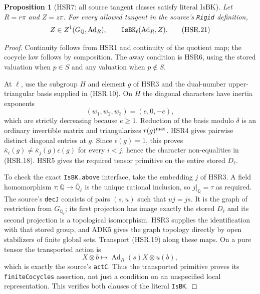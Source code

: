 \documentclass[11pt,a4paper]{article}
\numberwithin{equation}{section}
\newtheorem{proposition}[theorem]{Proposition}
\theoremstyle{remark}\newtheorem{remark}[theorem]{Remark}
\begin{document}
\begin{proposition}[HSR7: all source tangent classes satisfy literal IsBK]
\label{claim:HSR7}
Let $R=r\pi$ and $Z=z\pi$.  For every allowed tangent in the
source's \texttt{Rigid} definition,
\[
       Z\in Z^1(G_{\mathbb Q},\operatorname{Ad}_R),
       \qquad \texttt{Is\allowbreak BK}_{\ell}(\operatorname{Ad}_R,\allowbreak{} Z).
 \tag{HSR.21}
\]
\end{proposition}
\begin{proof}
Continuity follows from HSR1 and continuity of the quotient map;
the cocycle law follows by composition.  The away condition is
HSR6, using the stored valuation when $p\in S$ and any valuation
when $p\notin S$.

At $\ell$, use the subgroup $H$ and element $g$ of HSR3 and the
dual-number upper-triangular basis supplied in (HSR.10).  On $H$
the diagonal characters have inertia exponents
\[
                         (w_1,\allowbreak{} w_2,\allowbreak{} w_3)=(e,0,-e),
 \tag{HSR.22}
\]
which are strictly decreasing because $e\ge1$.  Reduction of
the basis modulo $\delta$ is an ordinary invertible matrix and
triangularizes $r(g)^{\rm mat}$.  HSR4 gives pairwise distinct
diagonal entries at $g$.  Since $\epsilon(g)=1$, this proves
$\bar\kappa_i(g)\ne\bar\kappa_j(g)\epsilon(g)$ for every
$i<j$, hence the character non-equalities in (HSR.18).
HSR5 gives the required tensor primitive on the entire stored
$D_\ell$.

To check the exact \texttt{Is\allowbreak BK.\allowbreak above} interface, take the embedding
$j$ of HSR3.  A field homomorphism
$\tau:\mathbb Q\to\overline{\mathbb Q}_\ell$ is the unique
rational inclusion, so $j|_{\mathbb Q}=\tau$ as required.
The source's \texttt{dec\allowbreak J} consists of pairs $(s,\allowbreak{} u)$ such that
$u j=j s$.  It is the graph of restriction from
$G_{\mathbb Q_\ell}$; its first projection has image exactly
the stored $D_\ell$ and its second projection is a topological
isomorphism.  HSR3 supplies the identification with that stored
group, and ADK5 gives the graph topology directly by open
stabilizers of finite global sets.  Transport (HSR.19) along these
maps.  On a pure tensor the transported action is
\[
            X\otimes b\longmapsto
            \operatorname{Ad}_R(s)X\otimes u(b),
\]
which is exactly the source's \texttt{act\allowbreak C}.  Thus the transported
primitive proves its \texttt{finite\allowbreak Cocycles} assertion, not just
a condition on an unspecified local representation.  This
verifies both clauses of the literal \texttt{Is\allowbreak BK}.
\end{proof}
\end{document}
